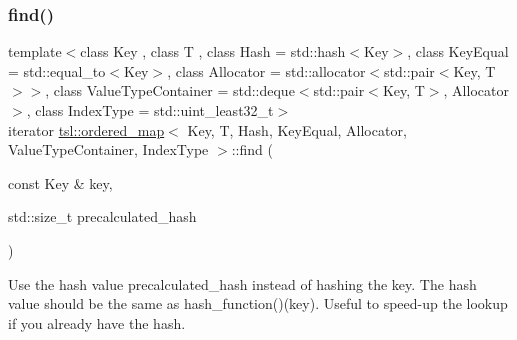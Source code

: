 \subsubsection{\texorpdfstring{find()}{find()}\hspace{0.1cm}{\footnotesize\ttfamily [1/6]}}
{\footnotesize\ttfamily template$<$class Key , class T , class Hash  = std\+::hash$<$\+Key$>$, class Key\+Equal  = std\+::equal\+\_\+to$<$\+Key$>$, class Allocator  = std\+::allocator$<$std\+::pair$<$\+Key, T$>$$>$, class Value\+Type\+Container  = std\+::deque$<$std\+::pair$<$\+Key, T$>$, Allocator$>$, class Index\+Type  = std\+::uint\+\_\+least32\+\_\+t$>$ \\
iterator \mbox{\hyperlink{classtsl_1_1ordered__map}{tsl\+::ordered\+\_\+map}}$<$ Key, T, Hash, Key\+Equal, Allocator, Value\+Type\+Container, Index\+Type $>$\+::find (\begin{DoxyParamCaption}\item[{const Key \&}]{key,  }\item[{std\+::size\+\_\+t}]{precalculated\+\_\+hash }\end{DoxyParamCaption})\hspace{0.3cm}{\ttfamily [inline]}}

Use the hash value \textquotesingle{}precalculated\+\_\+hash\textquotesingle{} instead of hashing the key. The hash value should be the same as hash\+\_\+function()(key). Useful to speed-\/up the lookup if you already have the hash. \mbox{\label{classtsl_1_1ordered__map_a817dd3a88ebcf2199e46606fd7925c5f}} 
